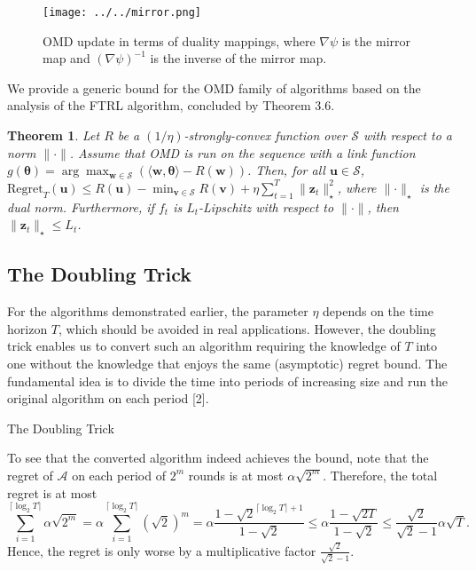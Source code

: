 \documentclass{article}
\newtheorem{theorem}{Theorem}[section]
\begin{document}
\begin{figure}[H]
  \centering
  \texttt{[image: ../../mirror.png]}
  \caption{OMD update in terms of duality mappings, where $\nabla \psi$ is the mirror map and $(\nabla \psi)^{-1}$ is the inverse of the mirror map.}
\end{figure}

We provide a generic bound for the OMD family of algorithms based on the analysis of the FTRL algorithm, concluded by Theorem 3.6.

\begin{theorem}
  Let $R$ be a $(1/\eta)$-strongly-convex function over $\mathcal{S}$ with respect to a norm $\lVert \cdot\rVert$. Assume that OMD is run on the sequence with a link function $g(\bm{\theta})=\arg\max_{\textbf{w}\in \mathcal{S}} (\langle \textbf{w},\bm{\theta}\rangle-R(\textbf{w}))$. Then, for all $\textbf{u}\in \mathcal{S}$, $\text{Regret}_T(\textbf{u})\leq R(\textbf{u})-\min_{\textbf{v}\in \mathcal{S}} R(\textbf{v})+\eta\sum_{t=1}^T \lVert \textbf{z}_t\rVert_\star ^2$, where $\lVert \cdot\rVert_\star$ is the dual norm. Furthermore, if $f_t$ is $L_t$-Lipschitz with respect to $\lVert\cdot\rVert$, then $\lVert \textbf{z}_t\rVert_\star\leq L_t$.
\end{theorem}


\subsection{The Doubling Trick}

For the algorithms demonstrated earlier, the parameter $\eta$ depends on the time horizon $T$, which should be avoided in real applications. However, the doubling trick enables us to convert such an algorithm requiring the knowledge of $T$ into one without the knowledge that enjoys the same (asymptotic) regret bound.
The fundamental idea is to divide the time into periods of increasing size and run the original algorithm on each period [2].

\begin{algorithm}[H]
  \caption{The Doubling Trick}
\end{algorithm}

To see that the converted algorithm indeed achieves the bound, note that the regret of $\mathcal{A}$ on each period of $2^m$ rounds is at most $\alpha \sqrt{2^m}$. Therefore, the total regret is at most \[\sum\limits_{i=1}^{\lceil\log_2 T\rceil}\alpha\sqrt{2^m}=\alpha\sum\limits_{i=1}^{\lceil \log_2 T\rceil} (\sqrt{2})^m=\alpha\frac{1-\sqrt{2}^{\lceil \log_2 T\rceil +1}}{1-\sqrt{2}}\leq \alpha\frac{1-\sqrt{2T}}{1-\sqrt{2}}\leq \frac{\sqrt{2}}{\sqrt{2}-1}\alpha \sqrt{T}.\]
Hence, the regret is only worse by a multiplicative factor $\frac{\sqrt{2}}{\sqrt{2}-1}$.
\end{document}
